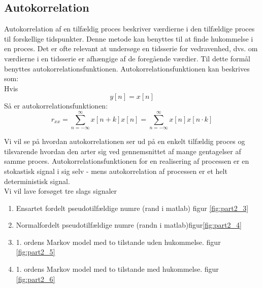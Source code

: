 \subsection{Autokorrelation}
Autokorrelation af en tilfældig proces beskriver værdierne i den tilfældige proces til forskellige tidspunkter. Denne metode kan benyttes til at finde hukommelse i en proces. 
Det er ofte relevant at undersøge en tidsserie for vedravenhed, dvs. om værdierne i en tidsserie er afhængige af de foregående værdier. Til dette formål benyttes autokorrelationsfunktionen.
Autokorrelationsfunktionen kan beskrives som:\\
Hvis
\begin{equation}
 y[n] = x[n]
\end{equation}
Så er autokorrelationsfunktionen: 
\begin{equation}
r_{xx}=\sum_{n = - \infty}^{\infty}x[n+k]x[n]=\sum^{\infty}_{n = -\infty}x[n]x[n\cdot k] 
\end{equation}

Vi vil se på hvordan autokorrelationen ser ud på en enkelt tilfældig proces og tilsvarende hvordan den arter sig ved 
gennemsnittet af mange gentagelser af samme proces.
Autokorrelationsfunktionen for en realisering af processen er en stokastisk signal i sig selv - mens autokorrelation af processen er et helt deterministisk signal.\\


Vi vil lave forsøget tre slags signaler  

\begin{enumerate}
	\item Ensartet fordelt pseudotilfældige numre (rand i matlab)   figur \ref{fig:part2_3}
	\item Normalfordelt pseudotilfældige numre (randn i matlab)figur\ref {fig:part2_4}
	\item 1. ordens Markov model med to tilstande uden hukommelse. figur \ref{fig:part2_5}
	\item 1. ordens Markov model med to tilstande med hukommelse. figur \ref{fig:part2_6} 
\end{enumerate}

